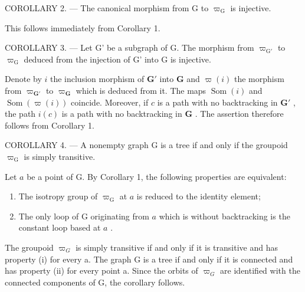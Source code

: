 COROLLARY 2. --- The canonical morphism from G to \(\varpi_{\mathrm{G}}\) is injective.

This follows immediately from Corollary 1.

COROLLARY 3. --- Let G' be a subgraph of G. The morphism from \(\varpi_{\mathrm{G}'}\) to \(\varpi_{\mathrm{G}}\) deduced from the injection of G' into G is injective.

Denote by \(i\) the inclusion morphism of \(\mathbf{G}'\) into \(\mathbf{G}\) and \(\varpi(i)\) the morphism from \(\varpi_{\mathbf{G}'}\) to \(\varpi_{\mathbf{G}}\) which is deduced from it. The maps \(\operatorname{Som}(i)\) and \(\operatorname{Som}(\varpi(i))\) coincide. Moreover, if \(c\) is a path with no backtracking in \(\mathbf{G}'\) , the path \(i(c)\) is a path with no backtracking in \(\mathbf{G}\) . The assertion therefore follows from Corollary 1.

COROLLARY 4. --- A nonempty graph G is a tree if and only if the groupoid \(\varpi_{\mathrm{G}}\) is simply transitive.

Let \(a\) be a point of G. By Corollary 1, the following properties are equivalent:

\begin{enumerate}
\def\labelenumi{(\roman{enumi})}
\item
  The isotropy group of \(\varpi_{\mathrm{G}}\) at \(a\) is reduced to the identity element;
\item
  The only loop of G originating from \(a\) which is without backtracking is the constant loop based at \(a\) .
\end{enumerate}

The groupoid \(\varpi_{G}\) is simply transitive if and only if it is transitive and has property (i) for every a. The graph G is a tree if and only if it is connected and has property (ii) for every point a. Since the orbits of \(\varpi_{G}\) are identified with the connected components of G, the corollary follows.

